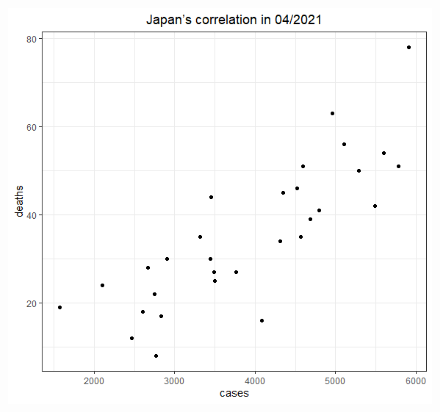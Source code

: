 \documentclass[a4paper]{article}
\theoremstyle{definition}
\begin{document}
\begin{enumerate}[1)]
\begin{figure}[H]
\begin{center}
        \includegraphics[scale = 0.3]{ix/ix.2/JPN_04_2021.png}
        

\end{center}
\end{figure}
\end{enumerate}
\end{document}
